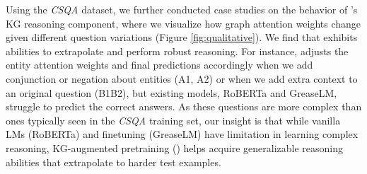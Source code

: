 Using the \textit{CSQA} dataset, we further conducted case studies on the behavior of \methodname's KG reasoning component, where we visualize how graph attention weights change given different question variations (Figure \ref{fig:qualitative}). We find that \methodname exhibits abilities to extrapolate and perform robust reasoning. For instance, \methodname adjusts the entity attention weights and final predictions accordingly when we add conjunction or negation about entities (A1, A2) or when we add extra context to an original question (B1B2), but existing models, RoBERTa and GreaseLM, struggle to predict the correct answers. 
As these questions are more complex than ones typically seen in the \textit{CSQA} training set, our insight is that while vanilla LMs (RoBERTa) and finetuning (GreaseLM) have limitation in learning complex reasoning, KG-augmented pretraining (\methodname) helps acquire generalizable reasoning abilities that extrapolate to harder test examples.




